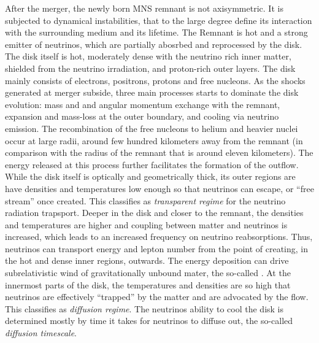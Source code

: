 After the merger, the newly born \ac{MNS} remnant is not axisymmetric. It is 
subjected to dynamical instabilities, that to the large degree define its interaction 
with the surrounding medium and its lifetime. The Remnant is hot and a strong emitter 
of neutrinos, which are partially abosrbed and reprocessed by the disk. The disk 
itself is hot, moderately dense with the neutrino rich inner matter, shielded from 
the neutrino irradiation, and proton-rich outer layers. The disk mainly consists of 
electrons, positrons, protons and free nucleons. As the shocks generated at merger 
subside, three main processes starts to dominate the disk evolution: mass and and 
angular momentum exchange with the remnant, expansion and mass-loss at the outer 
boundary, and cooling via neutrino emission. The recombination of the free nucleons 
to helium and heavier nuclei occur at large radii, around few hundred kilometers 
away from the remnant (in comparison with the radius of the remnant that is around 
eleven kilometers). The energy released at this process further facilitates the 
formation of the outflow. While the disk itself is optically and geometrically 
thick, its outer regions are have densities and temperatures low enough so that 
neutrinos can escape, or ``free stream'' once created. This classifies as 
\textit{transparent regime} for the neutrino radiation trapsport. 
Deeper in the disk and closer to the remnant, the densities and temperatures are 
higher and coupling between matter and neutrinos is increased, which leads to 
an increased frequency on neutrino reabsorptions. Thus, neutrinos can transport 
energy and lepton number from the point of creating, in the hot and dense inner 
regions, outwards. The energy deposition can drive subrelativistic wind of 
gravitationally unbound mater, the so-called \nwind{}.  
At the innermost parts of the disk, the temperatures and densities are so high 
that neutrinos are effectively ``trapped'' by the matter and are advocated by the 
flow. This classifies as \textit{diffusion regime}. The neutrinos ability to 
cool the disk is determined mostly by time it takes for neutrinos to diffuse out,
the so-called \textit{diffusion timescale}.

